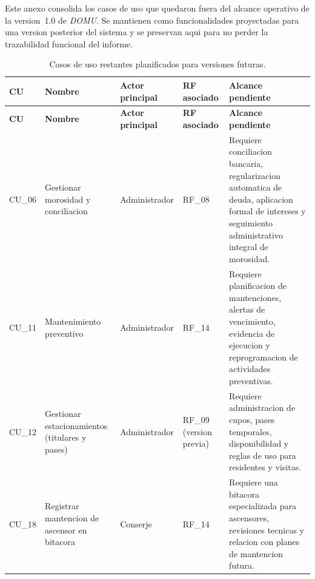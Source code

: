 
\renewcommand{\cutop}[2]{%
  \multicolumn{2}{|l|}{\textbf{#1\;\;#2}}\\\hline
}
\renewcommand{\cusec}[2]{%
  \multicolumn{2}{|p{0.96\linewidth}|}{\textbf{#1:}\;#2}\\\hline
}
\renewcommand{\cuheader}[2]{\textbf{#1} & \textbf{#2}\\\hline}

Este anexo consolida los casos de uso que quedaron fuera del alcance operativo de la version~1.0 de \textit{DOMU}. Se mantienen como funcionalidades proyectadas para una version posterior del sistema y se preservan aqui para no perder la trazabilidad funcional del informe.

\begin{longtable}{|p{}|p{}|p{}|p{}|p{}|}
\caption{Casos de uso restantes planificados para versiones futuras.}\label{tab:casos-restantes}\\
\hline
\textbf{CU} & \textbf{Nombre} & \textbf{Actor principal} & \textbf{RF asociado} & \textbf{Alcance pendiente} \\
\hline
\endfirsthead
\hline
\textbf{CU} & \textbf{Nombre} & \textbf{Actor principal} & \textbf{RF asociado} & \textbf{Alcance pendiente} \\
\hline
\endhead
\hline
\endfoot

CU\_06 & Gestionar morosidad y conciliacion & Administrador & RF\_08 & Requiere conciliacion bancaria, regularizacion automatica de deuda, aplicacion formal de intereses y seguimiento administrativo integral de morosidad. \\
\hline
CU\_11 & Mantenimiento preventivo & Administrador & RF\_14 & Requiere planificacion de mantenciones, alertas de vencimiento, evidencia de ejecucion y reprogramacion de actividades preventivas. \\
\hline
CU\_12 & Gestionar estacionamientos (titulares y pases) & Administrador & RF\_09 (version previa) & Requiere administracion de cupos, pases temporales, disponibilidad y reglas de uso para residentes y visitas. \\
\hline
CU\_18 & Registrar mantencion de ascensor en bitacora & Conserje & RF\_14 & Requiere una bitacora especializada para ascensores, revisiones tecnicas y relacion con planes de mantencion futura. \\
\hline
\end{longtable}

